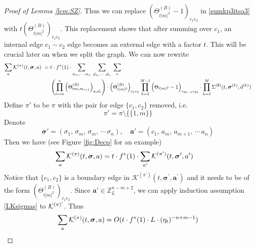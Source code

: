 \documentclass[10pt,reqno]{article}
\newcommand{\nc}{\normalcolor}
\theoremstyle{plain} %
\theoremstyle{remark}
\numberwithin{equation}{section}
\begin{document}
\begin{proof}[ Proof of Lemma  \ref{lem:SZ}]
Thus  we can replace $(\Theta^{(B)}_{t|m|^2}-1)_{c_1c_2}$ in \eqref{sumkp3itsa3} with $t(\Theta^{(B)}_{t|m|^2})_{c_1c_2}$.  
This replacement shows that after  summing  over $c_1$, an internal edge $c_1-c_2$ edge becomes an external edge with a factor $t$. This will be crucial later on when we split the graph.  We can now rewrite 
\begin{align}\label{sumkp4itsa4}
\sum_{\textbf{a}}{\cal K}^{(\pi)}(t, \boldsymbol{\sigma}, \textbf{a}) \;=\;&t\cdot f^*(1) \cdot  
\sum_{a_m,\cdots , a_n}\;
\sum_{d_m,\cdots , d_n}\;
\sum_{\textbf{c}}\\\nonumber
&\left(\prod_{i=m}^{n}\left(\Theta^{(B)}_{tm_im_{i+1}}\right)_{a_id_i}\right)\cdot 
\left(\Theta^{(B)}_{t|m|^2}\right)_{c_1c_2}
\prod_{k=2}^{M-1}\Big(\Theta_{{t|m|^2}}-1\Big)_{c_{2k-1}c_{2k}}
\cdot
 \prod_{k=2}^{M}{\Sigma}^{(\emptyset)}(t, \boldsymbol{\sigma}^{(k)}, \textbf{d}^{(k)})   
\end{align}
  Define $\pi'$ to be $\pi$ with the pair for edge $\{c_1, c_2\}$ removed, i.e. 
  $$
  \pi'=\pi\setminus\{\{1,m\}\}
  $$
  Denote 
$$
\boldsymbol{\sigma}'=(\sigma_1,  \,\sigma_{m}, \,\sigma_m, \,\cdots  \,\sigma_{n}) ,\quad \textbf{a}'=(c_1, \,a_{m},\,a_{m+1},\,\cdots\, a_{n})
$$
Then we have (see  Figure \ref{fig:Decp} for an example) 
\begin{align}\label{sumkp5itsa5}
\sum_{\textbf{a}}{\cal K}^{(\pi)}(t, \boldsymbol{\sigma}, \textbf{a})=t\cdot f^*(1) &\cdot  
\sum_{\textbf{a}'}{\cal K}^{(\pi')}(t, \boldsymbol{\sigma}', \textbf{a}') 
\end{align}
\nc 
Notice that   $\{c_1, c_2\}$  is  a boundary  edge in  
$\mathcal{K}^{\left(\pi^{\prime}\right)}\left(t, \boldsymbol{\sigma}^{\prime}, \mathbf{a}^{\prime}\right)$ and it needs to be of the form $\left(\Theta_{t|m|^2}^{(B)}\right)_{c_1 c_2}$.
Since $\boldsymbol{a}'\in \mathbb Z_L^{n-m+2}$, we can apply   induction  assumption  \eqref{LKsigmas} to  $\cal K^{(\pi)'}$. Thus 
\begin{align}\label{sumkp6itsa6}
\sum_{\textbf{a}}{\cal K}^{(\pi)}(t, \boldsymbol{\sigma}, \textbf{a})= {O(t\cdot f^*(1) \cdot L\cdot (\eta_t)^{-n+m-1})}
\end{align}



\end{proof}
\end{document}
